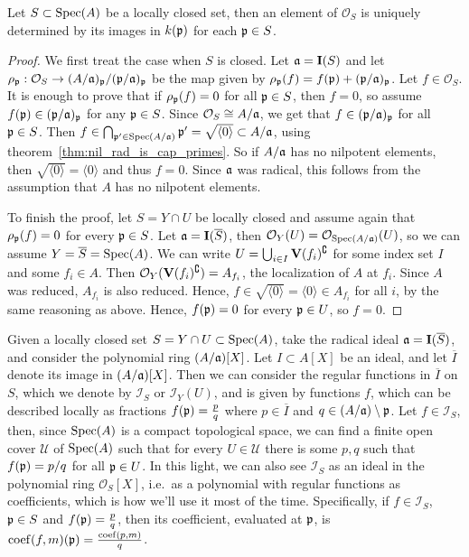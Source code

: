 \begin{lemma}\label{lem:O_Y_unique}
  Let $S \subset \operatorname{Spec}(A)$ be a locally closed set, then an element of $\mathcal O_{S}$ is uniquely determined by its images in $k(\mathfrak p)$ for each $\mathfrak p \in S$.
\end{lemma}
\begin{proof}
  We first treat the case when $S$ is closed. Let $\mathfrak{a} = \operatorname{\mathbf I}(S)$ and let $\rho_{\mathfrak p} : \mathcal O_{S} \to (A/\mathfrak{a})_{\mathfrak p}/(\mathfrak p/\mathfrak{a})_{\mathfrak p}$ be the map given by $\rho_{\mathfrak p}(f) = f(\mathfrak p) + (\mathfrak p/\mathfrak{a})_{\mathfrak p}$. Let $f \in \mathcal O_{S}$. It is enough to prove that if $\rho_{\mathfrak p}(f) = 0$ for all $\mathfrak p \in S$, then $f = 0$, so assume $f(\mathfrak p) \in (\mathfrak p/\mathfrak{a})_{\mathfrak p}$ for any $\mathfrak p \in S$. Since $\mathcal O_{S} \cong A/\mathfrak{a}$, we get that $f \in (\mathfrak p/\mathfrak{a})_{\mathfrak p}$ for all $\mathfrak p \in S$. Then $f \in \bigcap_{\mathfrak p' \in \operatorname{Spec}(A/\mathfrak{a})} \mathfrak p' = \sqrt{\langle 0 \rangle} \subset A/\mathfrak{a}$, using theorem~\ref{thm:nil_rad_is_cap_primes}. So if $A/\mathfrak{a}$ has no nilpotent elements, then $\sqrt{\langle 0 \rangle} = \langle 0 \rangle$ and thus $f = 0$. Since $\mathfrak{a}$ was radical, this follows from the assumption that $A$ has no nilpotent elements.

  To finish the proof, let $S = Y \cap U$ be locally closed and assume again that $\rho_{\mathfrak p}(f) = 0$ for every $\mathfrak p \in S$. Let $\mathfrak{a} = \operatorname{\mathbf I}(\overline S)$, then $\mathcal O_{Y}(U) = \mathcal O_{\operatorname{Spec}(A/\mathfrak{a})}(U)$, so we can assume $Y = \overline S = \operatorname{Spec}(A)$. We can write $U = \bigcup_{i \in I} \operatorname{\mathbf V}(f_{i})^{\complement}$ for some index set $I$ and some $f_{i} \in A$. Then $\mathcal O_{Y}(\operatorname{\mathbf V}(f_{i})^{\complement}) = A_{f_{i}}$, the localization of $A$ at $f_{i}$. Since $A$ was reduced, $A_{f_{i}}$ is also reduced. Hence, $f \in \sqrt{\langle 0 \rangle} = \langle 0 \rangle \in A_{f_{i}}$ for all $i$, by the same reasoning as above. Hence, $f(\mathfrak p) = 0$ for every $\mathfrak p \in U$, so $f = 0$.
\end{proof}

Given a locally closed set $S = Y \cap U \subset \operatorname{Spec}(A)$, take the radical ideal $\mathfrak{a} = \operatorname{\mathbf I}(\overline S)$, and consider the polynomial ring $(A/\mathfrak{a})[X]$. Let $I \subset A[X]$ be an ideal, and let $\overline I$ denote its image in $(A/\mathfrak{a})[X]$. Then we can consider the regular functions in $\overline I$ on $S$, which we denote by $\mathcal I_{S}$ or $\mathcal I_{Y}(U)$, and is given by functions $f$, which can be described locally as fractions $f(\mathfrak p) = \frac p q$ where $p \in \overline I$ and $q \in (A/\mathfrak{a}) \setminus \mathfrak p$. Let $f \in \mathcal I_{S}$, then, since $\operatorname{Spec}(A)$ is a compact topological space, we can find a finite open cover $\mathcal U$ of $\operatorname{Spec}(A)$ such that for every $U \in \mathcal U$ there is some $p, q$ such that $f(\mathfrak p) = p/q$ for all $\mathfrak p \in U$. In this light, we can also see $\mathcal I_{S}$ as an ideal in the polynomial ring $\mathcal O_{S}[X]$, i.e.\ as a polynomial with regular functions as coefficients, which is how we'll use it most of the time. Specifically, if $f \in \mathcal I_{S}$, $\mathfrak p \in S$ and $f(\mathfrak p) = \frac{p}{q}$, then its coefficient, evaluated at $\mathfrak p$, is $\operatorname{coef}(f, m)(\mathfrak p) = \frac{\operatorname{coef}(p, m)}{q}$.

